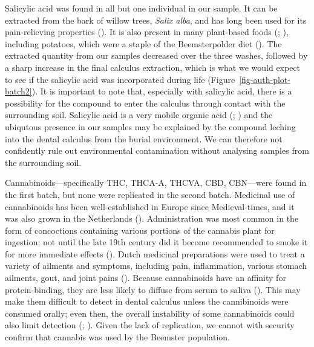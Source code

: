 \documentclass[
  b5paper,
]{book}
\begin{document}
Salicylic acid was found in all but one individual in our sample. It can
be extracted from the bark of willow trees, \emph{Salix alba}, and has
long been used for its pain-relieving properties
(). It is
also present in many plant-based foods
(;
),
including potatoes, which were a staple of the Beemsterpolder diet
(). The extracted
quantity from our samples decreased over the three washes, followed by a
sharp increase in the final calculus extraction, which is what we would
expect to see if the salicylic acid was incorporated during life
(Figure~\ref{fig-auth-plot-batch2}). It is important to note that,
especially with salicylic acid, there is a possibility for the compound
to enter the calculus through contact with the surrounding soil.
Salicylic acid is a very mobile organic acid
(;
) and the
ubiqutous presence in our samples may be explained by the compound
leching into the dental calculus from the burial environment. We can
therefore not confidently rule out environmental contamination without
analysing samples from the surrounding soil.

Cannabinoids---specifically THC, THCA-A, THCVA, CBD, CBN---were found in
the first batch, but none were replicated in the second batch. Medicinal
use of cannabinoids has been well-established in Europe since
Medieval-times, and it was also grown in the Netherlands
().
Administration was most common in the form of concoctions containing
various portions of the cannabis plant for ingestion; not until the late
19th century did it become recommended to smoke it for more immediate
effects ().
Dutch medicinal preparations were used to treat a variety of ailments
and symptoms, including pain, inflammation, various stomach ailments,
gout, and joint pains
(). Because
cannabinoids have an affinity for protein-binding, they are less likely
to diffuse from serum to saliva
(). This
may make them difficult to detect in dental calculus unless the
cannibinoids were consumed orally; even then, the overall instability of
some cannabinoids could also limit detection
(;
). Given the lack of replication, we cannot with security confirm
that cannabis was used by the Beemster population.
\end{document}

